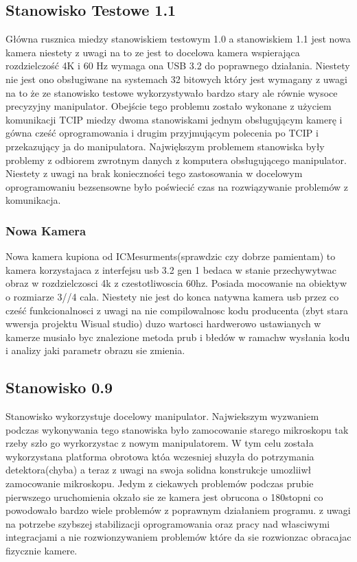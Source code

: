 \documentclass[11pt,a4paper]{article}
\begin{document}
    \subsection{Stanowisko Testowe 1.1}
    Główna rusznica miedzy stanowiskiem testowym 1.0 a stanowiskiem 1.1 jest nowa kamera niestety z uwagi na to ze jest to docelowa kamera wspierająca rozdzielczość 4K i 60 Hz wymaga ona USB 3.2 do poprawnego działania. Niestety nie jest ono obsługiwane na systemach 32 bitowych który jest wymagany z uwagi na to że ze stanowisko testowe wykorzystywało bardzo stary ale równie wysoce precyzyjny manipulator.
    Obejście tego problemu zostało wykonane z użyciem komunikacji TCIP miedzy dwoma stanowiskami jednym obsługującym kamerę i gówna cześć oprogramowania i drugim przyjmującym polecenia po TCIP i przekazujący ja do manipulatora. Największym problemem stanowiska były problemy z odbiorem zwrotnym danych z komputera obsługującego manipulator. Niestety z uwagi na brak konieczności tego zastosowania w docelowym oprogramowaniu bezsensowne było poświecić czas na rozwiązywanie problemów z komunikacja.

    \subsubsection{Nowa Kamera}
    Nowa kamera kupiona od ICMesurments(sprawdzic czy dobrze pamientam) to kamera korzystajaca z interfejsu usb 3.2 gen 1 bedaca w stanie przechywytwac obraz w rozdzielczosci 4k z czestotliwoscia 60hz. Posiada mocowanie na obiektyw o rozmiarze 3//4 cala. Niestety nie jest do konca natywna kamera usb przez co cześć funkcionalnosci z uwagi na nie compilowalnosc kodu producenta (zbyt stara wwersja projektu Wisual studio) duzo wartosci hardwerowo ustawianych w kamerze musiało byc znalezione metoda prub i błedów w ramachw wysłania kodu i analizy jaki parametr obrazu sie zmienia.

    \subsection{Stanowisko 0.9}
    Stanowisko wykorzystuje docelowy manipulator. Najwiekszym wyzwaniem podczas wykonywania tego stanowiska było zamocowanie starego mikroskopu tak rzeby szło go wyrkorzystac z nowym manipulatorem. W tym celu została wykorzystana platforma obrotowa któa wczesniej słuzyła do potrzymania detektora(chyba) a teraz z uwagi na swoja solidna konstrukcje umozliiwł zamocowanie mikroskopu. Jedym z ciekawych problemów podczas prubie pierwszego uruchomienia okzało sie ze kamera jest obrucona o 180stopni co powodowało bardzo wiele problemów z poprawnym działaniem programu. z uwagi na potrzebe szybszej stabilizacji oprogramowania oraz pracy nad własciwymi integracjami a nie rozwionzywaniem problemów które da sie rozwionzac obracajac fizycznie kamere.
\end{document}
